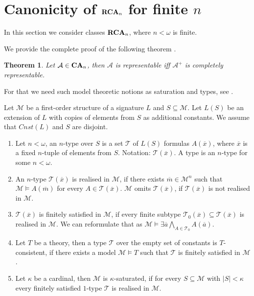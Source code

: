 \documentclass[a4paper]{article}
\theoremstyle{defin}
\theoremstyle{theorem}
\newtheorem{theorem}{Theorem}
\theoremstyle{claim}
\theoremstyle{prop}
\theoremstyle{lemma}
\theoremstyle{fact}
\theoremstyle{ex}
\theoremstyle{col}
\begin{document}
\section{Canonicity of ${\bf RCA}_n$ for finite $n$}

In this section we consider classes ${\bf RCA}_n$, where $n < \omega$ is finite.

We provide the complete proof of the following theorem \cite[Theorem 3.4.3]{hirsch2013completions}.
\begin{theorem}\label{finitecanon}
Let $\mathcal{A} \in {\bf CA}_n$, then $\mathcal{A}$ is representable iff $\mathcal{A}^{+}$ is completely representable.
\end{theorem}

For that we need such model theoretic notions as saturation and types, see \cite[Section 6.3]{hodges1993model}.

\begin{defin} Let $\mathcal{M}$ be a first-order structure of a signature $L$ and $S \subseteq \mathcal{M}$. Let $L(S)$ be an extension of $L$ with copies of elements from $S$ as additional constants. We assume that $Cnst(L)$ and $S$ are disjoint.

\begin{enumerate}
\item Let $n < \omega$, an $n$-type over $S$ is a set $\mathcal{T}$ of $L(S)$ formulas $A(\overline{x})$, where $\overline{x}$ is a fixed $n$-tuple of elements from $S$. Notation: $\mathcal{T}(\overline{x})$. A type is an $n$-type for some $n < \omega$.
\item An $n$-type $\mathcal{T}(\overline{x})$ is realised in $\mathcal{M}$, if there exists $\overline{m} \in \mathcal{M}^n$ such that $\mathcal{M} \models A(\overline{m})$ for every $A \in \mathcal{T}(\overline{x})$. $\mathcal{M}$ omits $\mathcal{T}(\overline{x})$, if $\mathcal{T}(\overline{x})$ is not realised in $\mathcal{M}$.
\item $\mathcal{T}(\overline{x})$ is finitely satisfied in $\mathcal{M}$, if every finite subtype $\mathcal{T}_0(\overline{x}) \subseteq \mathcal{T}(\overline{x})$ is realised in $\mathcal{M}$. We can reformulate that as $\mathcal{M} \models \exists \overline{a} \bigwedge \limits_{A \in \mathcal{T}_0} A(\overline{a})$.
\item Let $T$ be a theory, then a type $\mathcal{T}$ over the empty set of constants is $T$-consistent, if there exists a model $\mathcal{M} \models T$ such that $\mathcal{T}$ is finitely satisfied in $\mathcal{M}$.
\item Let $\kappa$ be a cardinal, then $\mathcal{M}$ is $\kappa$-saturated, if for every $S \subseteq \mathcal{M}$ with $|S| < \kappa$ every finitely satisfied $1$-type $\mathcal{T}$ is realised in $\mathcal{M}$.
\end{enumerate}
\end{defin}
\end{document}
